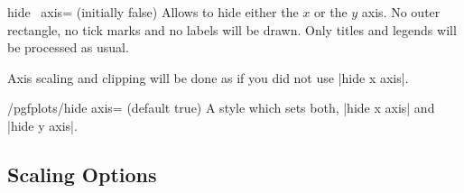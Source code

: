 \begin{pgfplotsxykey}{hide \x\ axis= (initially false)}
Allows to hide either the $x$ or the $y$ axis. No outer rectangle, no tick marks and no labels will be drawn. Only titles and legends will be processed as usual.

Axis scaling and clipping will be done as if you did not use |hide x axis|.
\begin{codeexample}[]
\end{codeexample}

\begin{codeexample}[]
\end{codeexample}
\end{pgfplotsxykey}

\begin{stylekey}{/pgfplots/hide axis= (default true)}
	A style which sets both, |hide x axis| and |hide y axis|.
\end{stylekey}


\subsection{Scaling Options}

